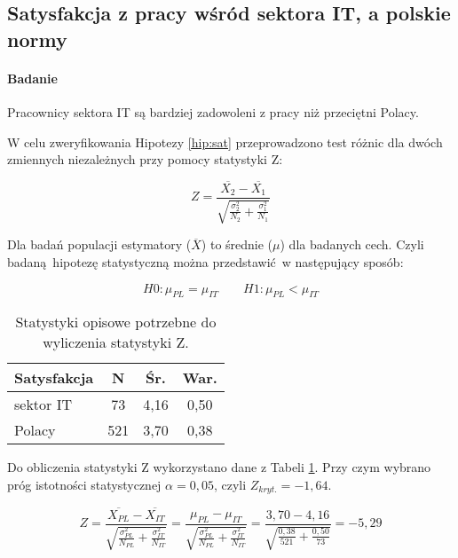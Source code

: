 \subsection{Satysfakcja z pracy wśród sektora IT, a polskie normy}
\paragraph{Badanie}
\begin{hyp}
  Pracownicy sektora IT są bardziej zadowoleni z pracy niż przeciętni Polacy.
  \label{hip:sat}
\end{hyp}

W celu zweryfikowania Hipotezy \ref{hip:sat} przeprowadzono test różnic dla dwóch zmiennych niezależnych przy pomocy statystyki Z:

\begin{equation}
  Z = \frac{\overline{X_2} - \overline{X_1}}{\sqrt{\frac{\sigma^2_2}{N_2}+\frac{\sigma^2_1}{N_1}}}
\end{equation}

Dla badań populacji estymatory ($\overline{X}$) to średnie ($\mu$) dla badanych cech. Czyli badaną hipotezę statystyczną można przedstawić w następujący sposób:

\begin{equation}
  H0: \mu_{PL} = \mu_{IT} \qquad H1: \mu_{PL} < \mu_{IT}
\end{equation}

\begin{table}[h!b]
  \begin{center}
    \begin{tabular}{l | c c c }
      Satysfakcja & N & Śr. & War. \\ \hline
      sektor IT & 73 & 4,16 & 0,50 \\
      Polacy & 521 & 3,70 & 0,38 \\
    \end{tabular}
  \end{center}
  \caption{Statystyki opisowe potrzebne do wyliczenia statystyki Z.}
  \label{tab:jss-norms-data}
\end{table}

Do obliczenia statystyki Z wykorzystano dane z Tabeli \ref{tab:jss-norms-data}. Przy czym wybrano próg istotności statystycznej $\alpha = 0,05$, czyli $Z_{kryt.} = -1,64$.

\begin{equation}
  Z = \frac{\overline{X_{PL}} - \overline{X_{IT}}}{\sqrt{\frac{\sigma^2_{PL}}{N_{PL}}+\frac{\sigma^2_{IT}}{N_{IT}}}} = \frac{\mu_{PL} - \mu_{IT}}{\sqrt{\frac{\sigma^2_{PL}}{N_{PL}}+\frac{\sigma^2_{IT}}{N_{IT}}}} = \frac{3,70 - 4,16}{\sqrt{\frac{0,38}{521}+\frac{0,50}{73}}} = -5,29 
\end{equation}

